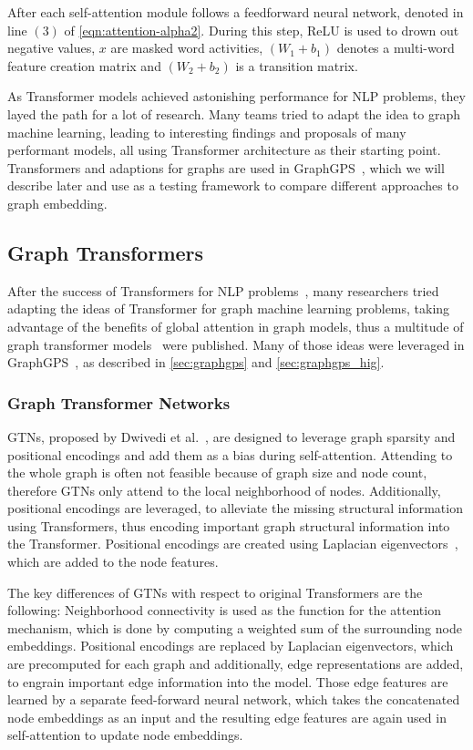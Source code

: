 After each self-attention module follows a feedforward neural network, denoted in line $(3)$ of \autoref{eqn:attention-alpha2}. During this step, ReLU is used to drown out negative values, $x$ are masked word activities, $(W_1 + b_1)$ denotes a multi-word feature creation matrix and $(W_2 + b_2)$ is a transition matrix.

As Transformer models achieved astonishing performance for NLP problems, they layed the path for a lot of research. Many teams tried to adapt the idea to graph machine learning, leading to interesting findings and proposals of many performant models, all using Transformer architecture as their starting point. Transformers and adaptions for graphs are used in GraphGPS~\cite{2023graphgps}, which we will describe later and use as a testing framework to compare different approaches to graph embedding.
\subsection{Graph Transformers}
After the success of Transformers for NLP problems~\cite{kalyan2021ammus}, many researchers tried adapting the ideas of Transformer for graph machine learning problems, taking advantage of the benefits of global attention in graph models, thus a multitude of graph transformer models~\cite{dwivedi2021generalizationTransformer,2021graphormer,kreuzer2021rethinking,mialon2021graphit,wu2022representing} were published. Many of those ideas were leveraged in GraphGPS~\cite{2023graphgps}, as described in \ref{sec:graphgps} and \ref{sec:graphgps_hig}.

\subsubsection{Graph Transformer Networks}
GTNs, proposed by Dwivedi et al.~\cite{dwivedi2021generalizationTransformer}, are designed to leverage graph sparsity and positional encodings and add them as a bias during self-attention. Attending to the whole graph is often not feasible because of graph size and node count, therefore GTNs only attend to the local neighborhood of nodes. Additionally, positional encodings are leveraged, to alleviate the missing structural information using Transformers, thus encoding important graph structural information into the Transformer. Positional encodings are created using Laplacian eigenvectors~\cite{belkin2003laplacian}, which are added to the node features.

The key differences of GTNs with respect to original Transformers are the following: Neighborhood connectivity is used as the function for the attention mechanism, which is done by computing a weighted sum of the surrounding node embeddings. Positional encodings are replaced by Laplacian eigenvectors, which are precomputed for each graph and additionally, edge representations are added, to engrain important edge information into the model. Those edge features are learned by a separate feed-forward neural network, which takes the concatenated node embeddings as an input and the resulting edge features are again used in self-attention to update node embeddings.


